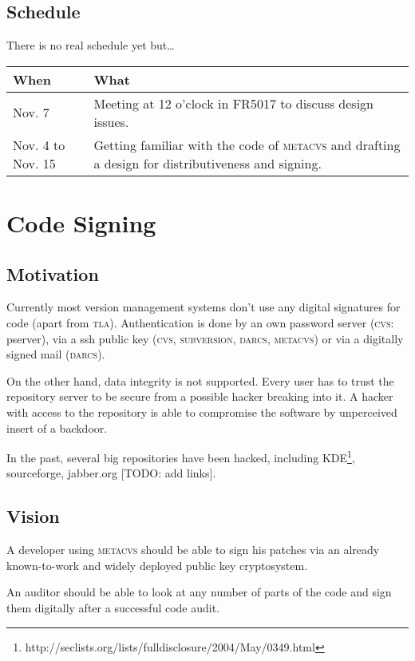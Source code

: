 \documentclass[fleqn, german, 10pt, a4paper]{article}
\begin{document}
\subsection{Schedule \label{schedule}}
There is no real schedule yet but\ldots

\begin{tabular}{|p{}|p{}|}
\hline
\textmd{When} & \textmd{What} \\
\hline\hline
Nov. 7 &
Meeting at 12 o'clock in FR5017 to discuss design issues. \\
\hline
Nov. 4 to Nov. 15 &
Getting familiar with the code of \textsc{metacvs}
and drafting a design for distributiveness and signing. \\
\hline
\end{tabular}

\section{Code Signing}

\subsection{Motivation}
Currently most version management systems don't use any digital signatures
for code (apart from \textsc{tla}). Authentication is done by an own password
server (\textsc{cvs}: pserver), via a ssh public key (\textsc{cvs},
\textsc{subversion}, \textsc{darcs}, \textsc{metacvs}) or
via a digitally signed mail (\textsc{darcs}).

On the other hand, data integrity is not supported.
Every user has to trust the repository server
to be secure from a possible hacker breaking into it.
A hacker with access to the repository is able to compromise the
software by unperceived insert of a backdoor.

In the past, several big repositories have been hacked, including
KDE\footnote{http://seclists.org/lists/fulldisclosure/2004/May/0349.html},
sourceforge, jabber.org [TODO: add links].


\subsection{Vision}
A developer using \textsc{metacvs} should be able to sign his patches via
an already known-to-work and widely deployed public key cryptosystem.

An auditor should be able to look at any number of parts of the code
and sign them digitally after a successful code audit.
\end{document}
